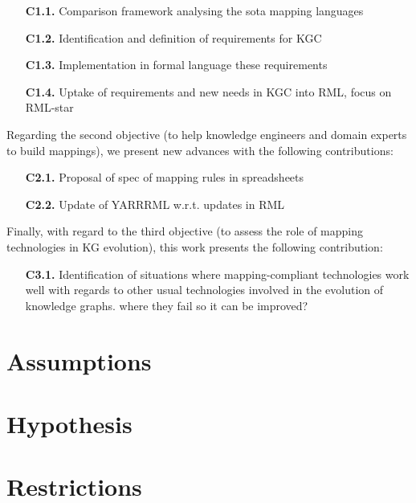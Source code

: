 \begin{enumerate}
    \item[\textbf{C1.1.}] Comparison framework analysing the sota mapping languages
    \item[\textbf{C1.2.}] Identification and definition of requirements for KGC 
    \item[\textbf{C1.3.}] Implementation in formal language these requirements
    \item[\textbf{C1.4.}] Uptake of requirements and new needs in KGC into RML, focus on RML-star
\end{enumerate}

Regarding the second objective (to help knowledge engineers and domain experts to build mappings), we present new advances with the following contributions:

\begin{enumerate}
    \item[\textbf{C2.1.}] Proposal of spec of mapping rules in spreadsheets
    \item[\textbf{C2.2.}] Update of YARRRML w.r.t. updates in RML 
\end{enumerate}

Finally, with regard to the third objective (to assess the role of mapping technologies in KG evolution), this work presents the following contribution:

\begin{enumerate}
    \item[\textbf{C3.1.}] Identification of situations where mapping-compliant technologies work well with regards to other usual technologies involved in the evolution of knowledge graphs.  where they fail so it can be improved?
\end{enumerate}


\section{Assumptions}
\label{sec:chp3-assumptions}



\section{Hypothesis}
\label{sec:chp3-hypothesis}



\section{Restrictions}
\label{sec:chp3-restrictions}
